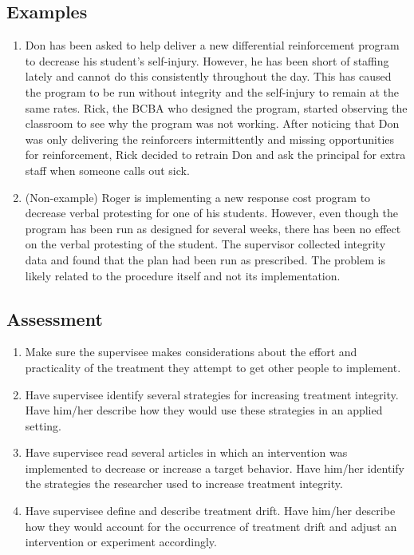 \subsection{Examples}
\begin{enumerate}
\item Don has been asked to help deliver a new differential reinforcement program to decrease his student's self-injury. However, he has been short of staffing lately and cannot do this consistently throughout the day. This has caused the program to be run without integrity and the self-injury to remain at the same rates. Rick, the BCBA who designed the program, started observing the classroom to see why the program was not working. After noticing that Don was only delivering the reinforcers intermittently and missing opportunities for reinforcement, Rick decided to retrain Don and ask the principal for extra staff when someone calls out sick. 
\item (Non-example) Roger is implementing a new response cost program to decrease verbal protesting for one of his students. However, even though the program has been run as designed for several weeks, there has been no effect on the verbal protesting of the student. The supervisor collected integrity data and found that the plan had been run as prescribed. The problem is likely related to the procedure itself and not its implementation.
%
\end{enumerate}
%
\subsection{Assessment}
\begin{enumerate}
\item Make sure the supervisee makes considerations about the effort and practicality of the treatment they attempt to get other people to implement.
\item Have supervisee identify several strategies for increasing treatment integrity. Have him/her describe how they would use these strategies in an applied setting.
\item Have supervisee read several articles in which an intervention was implemented to decrease or increase a target behavior. Have him/her identify the strategies the researcher used to increase treatment integrity.
\item Have supervisee define and describe treatment drift. Have him/her describe how they would account for the occurrence of treatment drift and adjust an intervention or experiment accordingly.
%
\end{enumerate}
%

